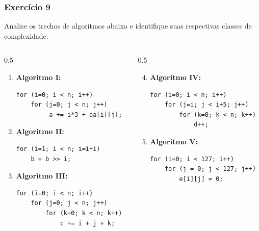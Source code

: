 \documentclass[aspectratio=169]{beamer}
\begin{document}
\begin{frame}[fragile]\frametitle{Exercício 9} %
Analise os trechos de algoritmos abaixo e identifique suas respectivas classes de complexidade.

\begin{columns}[T]
\begin{column}{0.5\linewidth}
\begin{enumerate}
	\item \textbf{Algoritmo I:}
{\scriptsize
\begin{verbatim}
for (i=0; i < n; i++)
    for (j=0; j < n; j++)
         a += i*3 + aa[i][j];
\end{verbatim}
}
	\item \textbf{Algoritmo II:}
{\scriptsize
\begin{verbatim}
for (i=1; i < n; i=i+i)
    b = b >> i;
\end{verbatim}
}
	\item \textbf{Algoritmo III:}
{\scriptsize
\begin{verbatim}
for (i=0; i < n; i++)
    for (j=0; j < n; j++)
        for (k=0; k < n; k++)
            c += i + j + k;
\end{verbatim}
}
\end{enumerate}
\end{column}
\begin{column}{0.5\linewidth}
\begin{enumerate}
	\setcounter{enumi}{3}
	\item \textbf{Algoritmo IV:}
{\scriptsize
\begin{verbatim}
for (i=0; i < n; i++)
    for (j=i; j < i+5; j++)
        for (k=0; k < n; k++)
            d++;
\end{verbatim}
}
	\item \textbf{Algoritmo V:}
{\scriptsize
\begin{verbatim}
for (i=0; i < 127; i++)
    for (j = 0; j < 127; j++)
        e[i][j] = 0;
\end{verbatim}
}
\end{enumerate}
\end{column}
\end{columns}
\end{frame}
\end{document}
